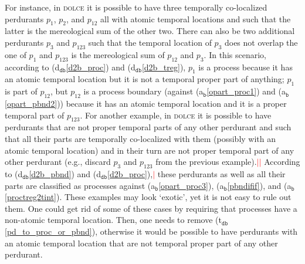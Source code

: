 \documentclass[ao]{iosart2x}
\newcommand{\nb}[1]{\textcolor{red}{$|$}\marginpar{\hspace*{-0cm}\parbox{20mm}{\scriptsize\raggedright\textcolor{red}{#1}}}}
\newcommand{\bfoAxLabel}{\textrm{a$_\texttt{b}$}}
\newcommand{\dbDefLabel}{\textrm{d$_\texttt{db}$}}
\newcommand{\dbThrLabel}{\textrm{t$_\texttt{db}$}}
\newcommand{\refbfoax}[1]{({\bfoAxLabel}\ref{#1})}
\newcommand{\refdbdf}[1]{({\dbDefLabel}\ref{#1})}
\newcommand{\refdbth}[1]{({\dbThrLabel}\ref{#1})}
\newcommand{\pr}[1]{\mathtt{#1}}
\newcommand{\dolce}{{\textsc{dolce}}}
\newcommand {\SUMd} {\ensuremath{\pr{SUM}}}
\begin{document}
For instance, in {\dolce} it is possible to have three temporally co-localized perdurants $p_1$, $p_2$, and $p_{12}$ all with atomic temporal locations and such that  the latter is the mereological sum of the other two. %
There can also be two additional perdurants $p_3$ and $p_{123}$ such that the temporal location of $p_3$ does not overlap the one of $p_1$ and $p_{123}$ is the mereological sum of $p_{12}$ and $p_{3}$. %
 In this scenario, according to \refdbdf{d2b_proc} and \refdbdf{d2b_treg}, $p_{1}$ is a process because it has an atomic temporal location but it is not a temporal proper part of anything; $p_1$ is part of $p_{12}$, but $p_{12}$ is a process boundary  (against \refbfoax{opart_proc1} and \refbfoax{opart_pbnd2}) because it has an atomic temporal location and it is a proper temporal part of $p_{123}$. For another example, in {\dolce} it is possible to have perdurants that are not proper temporal parts of any other perdurant and such that all their parts are temporally co-localized with them (possibly with an atomic temporal location) and in their turn are not proper temporal part of any other perdurant (e.g., discard $p_3$ and $p_{123}$ from the previous example).\nb{SB: a me questo esempio non è chiaro}\nb{CM: cos'è che non ti è chiaro} According to \refdbdf{d2b_pbnd} and \refdbdf{d2b_proc},\nb{CM: ho messo il rif. a pbnd} these perdurants as well as all their parts are classified as processes against \refbfoax{opart_proc3}, \refbfoax{pbndifif}, and \refbfoax{proctreg2tint}. These examples may look `exotic', yet it is not easy to rule out them. One could get rid of some of these cases by requiring that processes have a non-atomic temporal location. Then, one needs to remove \refdbth{pd_to_proc_or_pbnd}, otherwise it would be possible to have perdurants with an atomic temporal location that are not temporal proper part of any other perdurant. 
\end{document}
